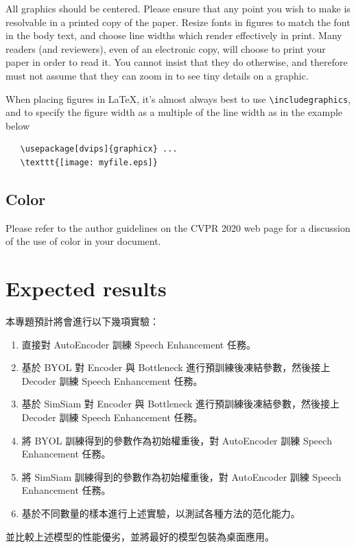\documentclass[10pt,twocolumn,letterpaper]{article}
\begin{document}
\begin{CJK}{UTF8}{bkai}
   All graphics should be centered.  Please ensure that any point you wish to
   make is resolvable in a printed copy of the paper.  Resize fonts in figures
   to match the font in the body text, and choose line widths which render
   effectively in print.  Many readers (and reviewers), even of an electronic
   copy, will choose to print your paper in order to read it.  You cannot
   insist that they do otherwise, and therefore must not assume that they can
   zoom in to see tiny details on a graphic.

   When placing figures in \LaTeX, it's almost always best to use
   \verb+\includegraphics+, and to specify the  figure width as a multiple of
   the line width as in the example below
      {\small\begin{verbatim}
   \usepackage[dvips]{graphicx} ...
   \texttt{[image: myfile.eps]}
\end{verbatim}
      }


   \subsection{Color}

   Please refer to the author guidelines on the CVPR 2020 web page for a discussion
   of the use of color in your document.

   \section{Expected results}
   本專題預計將會進行以下幾項實驗：
   \begin{enumerate}
      \item 直接對 AutoEncoder 訓練 Speech Enhancement 任務。
      \item 基於 BYOL 對 Encoder 與 Bottleneck 進行預訓練後凍結參數，然後接上 Decoder 訓練 Speech Enhancement 任務。
      \item 基於 SimSiam 對 Encoder 與 Bottleneck 進行預訓練後凍結參數，然後接上 Decoder 訓練 Speech Enhancement 任務。
      \item 將 BYOL 訓練得到的參數作為初始權重後，對 AutoEncoder 訓練 Speech Enhancement 任務。
      \item 將 SimSiam 訓練得到的參數作為初始權重後，對 AutoEncoder 訓練 Speech Enhancement 任務。
      \item 基於不同數量的樣本進行上述實驗，以測試各種方法的范化能力。
   \end{enumerate}

   並比較上述模型的性能優劣，並將最好的模型包裝為桌面應用。


   {\small
   
   
   }
\end{CJK}
\end{document}
